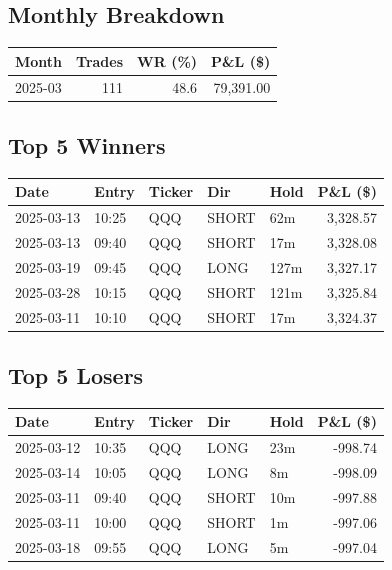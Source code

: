 \documentclass[11pt,a4paper,twoside]{article}
\begin{document}
\subsection{Monthly Breakdown}
\noindent\begin{center}
\begin{tabular}{>{\color{txtmain}}l rrr}
\toprule
\rowcolor{cardbg}
\textbf{Month} & \textbf{Trades} & \textbf{WR (\%)} & \textbf{P\&L (\$)} \\
\midrule
2025-03 & 111 & 48.6 & \textcolor{wingreen}{79,391.00} \\
\bottomrule
\end{tabular}
\end{center}
\subsection{Top 5 Winners}
\noindent\begin{center}
\begin{tabular}{>{\color{txtmain}}l llll r}
\toprule
\rowcolor{cardbg}
\textbf{Date} & \textbf{Entry} & \textbf{Ticker} & \textbf{Dir} & \textbf{Hold} & \textbf{P\&L (\$)} \\
\midrule
2025-03-13 & 10:25 & QQQ & SHORT & 62m & \textcolor{wingreen}{3,328.57} \\
2025-03-13 & 09:40 & QQQ & SHORT & 17m & \textcolor{wingreen}{3,328.08} \\
2025-03-19 & 09:45 & QQQ & LONG & 127m & \textcolor{wingreen}{3,327.17} \\
2025-03-28 & 10:15 & QQQ & SHORT & 121m & \textcolor{wingreen}{3,325.84} \\
2025-03-11 & 10:10 & QQQ & SHORT & 17m & \textcolor{wingreen}{3,324.37} \\
\bottomrule
\end{tabular}
\end{center}
\subsection{Top 5 Losers}
\noindent\begin{center}
\begin{tabular}{>{\color{txtmain}}l llll r}
\toprule
\rowcolor{cardbg}
\textbf{Date} & \textbf{Entry} & \textbf{Ticker} & \textbf{Dir} & \textbf{Hold} & \textbf{P\&L (\$)} \\
\midrule
2025-03-12 & 10:35 & QQQ & LONG & 23m & \textcolor{lossred}{-998.74} \\
2025-03-14 & 10:05 & QQQ & LONG & 8m & \textcolor{lossred}{-998.09} \\
2025-03-11 & 09:40 & QQQ & SHORT & 10m & \textcolor{lossred}{-997.88} \\
2025-03-11 & 10:00 & QQQ & SHORT & 1m & \textcolor{lossred}{-997.06} \\
2025-03-18 & 09:55 & QQQ & LONG & 5m & \textcolor{lossred}{-997.04} \\
\bottomrule
\end{tabular}
\end{center}
\clearpage
\end{document}

